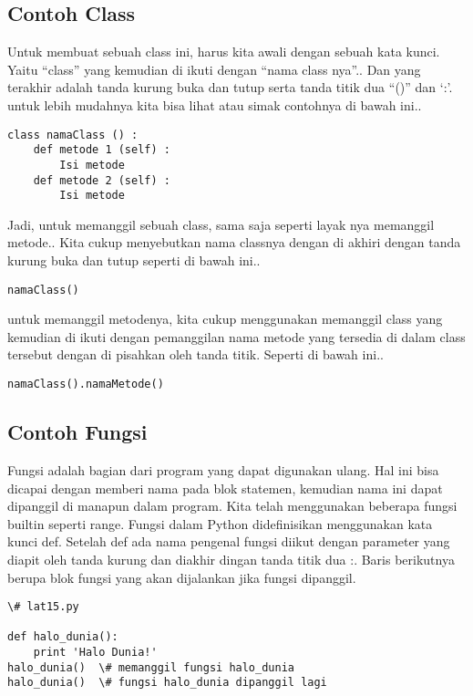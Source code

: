 \subsection{Contoh Class}
Untuk membuat sebuah class ini, harus kita awali dengan sebuah kata kunci. Yaitu “class” yang kemudian di ikuti dengan 
“nama class nya”.. Dan yang terakhir adalah tanda kurung buka dan tutup serta tanda titik dua “()” dan ‘:’.  untuk lebih
mudahnya kita bisa lihat atau simak contohnya di bawah ini..

\begin{verbatim}
class namaClass () :
    def metode 1 (self) :
        Isi metode
    def metode 2 (self) :
        Isi metode
\end{verbatim}

Jadi, untuk memanggil sebuah class, sama saja seperti layak nya memanggil metode.. Kita cukup menyebutkan nama classnya 
dengan di akhiri dengan tanda kurung buka dan tutup seperti di bawah ini..

\begin{verbatim}
namaClass()
\end{verbatim}

untuk memanggil metodenya, kita cukup menggunakan memanggil class yang kemudian di ikuti dengan pemanggilan nama metode yang 
tersedia di dalam class tersebut dengan di pisahkan oleh tanda titik. Seperti di bawah ini..

\begin{verbatim}
namaClass().namaMetode()
\end{verbatim}

\subsection{Contoh Fungsi}
Fungsi adalah bagian dari program yang dapat digunakan ulang. Hal ini bisa dicapai dengan memberi nama pada blok statemen,
kemudian nama ini dapat dipanggil di manapun dalam program. Kita telah menggunakan beberapa fungsi builtin seperti range.
Fungsi dalam Python didefinisikan menggunakan kata kunci def. Setelah def ada nama pengenal fungsi diikut dengan parameter
yang diapit oleh tanda kurung dan diakhir dingan tanda titik dua :. Baris berikutnya berupa blok fungsi yang akan dijalankan 
jika fungsi dipanggil.

\begin{verbatim}
\# lat15.py

def halo_dunia():
    print 'Halo Dunia!'
halo_dunia()  \# memanggil fungsi halo_dunia
halo_dunia()  \# fungsi halo_dunia dipanggil lagi
\end{verbatim}


